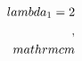 \documentclass[preview]{standalone}
\begin{document}
\begin{align*}
\special{dvisvgm:raw <g id='unique000'>}\\lambda_1 = 2\\,\\mathrm{cm}\special{dvisvgm:raw </g>}
\end{align*}
\end{document}
